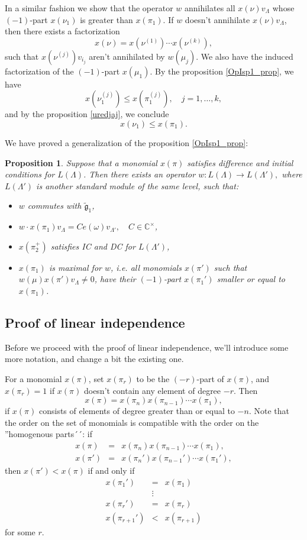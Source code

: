 \documentclass[a4paper, 10pt,oneside]{amsart}
\newtheorem{prop}[tm]{Proposition}
\begin{document}
In a similar fashion we show that the operator $w$ annihilates all
$x(\nu)v_\Lambda$ whose $(-1)$-part $x(\nu_1)$ is greater than
$x(\pi_1)$. If $w$ doesn't annihilate $x(\nu)v_\Lambda$, then
there exists a factorization
$$x(\nu)=x(\nu^{(1)})\cdots x(\nu^{(k)}),$$
such that $x(\nu^{(j)})v_{i_j}$ aren't annihilated by $w(\mu_j)$.
We also have the induced factorization of the $(-1)$-part $x(\mu_1)$.
By the proposition \ref{OpIsp1_prop}, we have
$$x(\nu_1^{(j)})\leq x(\pi_1^{(j)}),\quad j=1,\dots,k,$$
and by the proposition \ref{uredjaj}, we conclude
$$x(\nu_1)\leq x(\pi_1).$$

We have proved a generalization of the proposition
\ref{OpIsp1_prop}:
\begin{prop} \label{OpIspk_prop}
Suppose that a monomial  $x(\pi)$ satisfies difference and initial
conditions for $L(\Lambda)$. Then there
exists an operator $w:L(\Lambda) \to L(\Lambda'),$
where $L(\Lambda')$ is another standard module of the same level, such that:
\begin{itemize}
\item $w$ commutes with ${\tilde{{\mathfrak g}}}_1$,
\item $w\cdot x(\pi_1)v_\Lambda= C e(\omega)
v_{\Lambda'},\quad C\in{{\mathbb C}}^\times$,
\item $x(\pi_2^+)$ satisfies IC and DC for $L(\Lambda')$,
\item $x(\pi_1)$ is maximal for $w$, i.e. all monomials  $x(\pi')$ such that $w(\mu)x(\pi')v_\Lambda\neq 0$, have their $(-1)$-part $x(\pi_1')$
smaller or equal to $x(\pi_1)$.
\end{itemize}
\end{prop}

\subsection{Proof of linear independence}

Before we proceed with the proof of linear independence, we'll
introduce some more notation, and change a bit the existing one.

For a  monomial $x(\pi)$, set $x(\pi_r)$ to be the $(-r)$-part of $x(\pi)$, and $x(\pi_r)=1$ if $x(\pi)$ doesn't contain any element of
degree $-r$. Then $$x(\pi)=x(\pi_n)x(\pi_{n-1})\cdots x(\pi_1),$$
if $x(\pi)$ consists of elements of degree greater than or equal to $-n$.
Note that the order on the set of monomials is compatible with the order
on the ''homogenous parts´´: if
\begin{eqnarray*}
x(\pi) & = & x(\pi_n)x(\pi_{n-1})\cdots x(\pi_1),\\
x(\pi') & = & x(\pi_n')x(\pi_{n-1}')\cdots x(\pi_1'),
\end{eqnarray*}
then $x(\pi')<x(\pi)$ if and only if \begin{eqnarray*}
x(\pi_1') & = & x(\pi_1)\\
& \vdots &\\
x(\pi_r') & = & x(\pi_r)\\
x(\pi_{r+1}') & < & x(\pi_{r+1})
\end{eqnarray*}
for some $r$.
\end{document}
